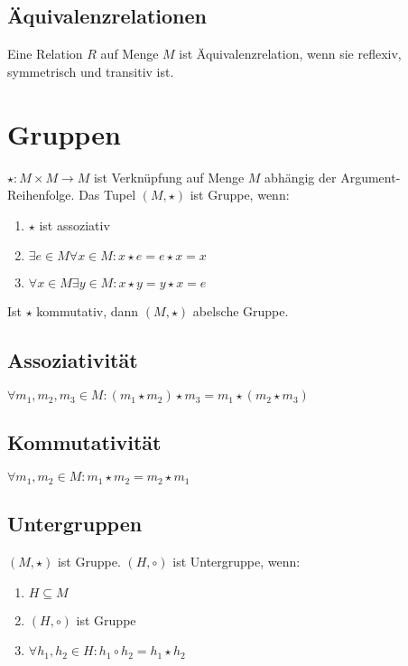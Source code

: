 \subsection*{Äquivalenzrelationen}

Eine Relation $R$ auf Menge $M$ ist Äquivalenzrelation, wenn sie reflexiv, symmetrisch und transitiv ist.

\section*{Gruppen}

$\star : M \times M \rightarrow M$ ist Verknüpfung auf Menge $M$ abhängig der Argument-Reihenfolge. Das Tupel $(M, \star)$ ist Gruppe, wenn:

\begin{enumerate}[label=(\alph*)]
	\item $\star$ ist assoziativ
	\item $\exists e \in M \forall x \in M : x \star e = e \star x = x$
	\item $\forall x \in M \exists y \in M : x \star y = y \star x = e$
\end{enumerate}

Ist $\star$ kommutativ, dann $(M, \star)$ abelsche Gruppe.

\subsection*{Assoziativität}

$\forall m_1, m_2, m_3 \in M : (m_1 \star m_2) \star m_3 = m_1 \star (m_2 \star m_3)$

\subsection*{Kommutativität}

$\forall m_1, m_2 \in M : m_1 \star m_2 = m_2 \star m_1$

\subsection*{Untergruppen}

$(M, \star)$ ist Gruppe. $(H, \circ)$ ist Untergruppe, wenn:

\begin{enumerate}[label=(\alph*)]
	\item $H \subseteq M$
	\item $(H, \circ)$ ist Gruppe
	\item $\forall h_1, h_2 \in H : h_1 \circ h_2 = h_1 \star h_2$
\end{enumerate}

